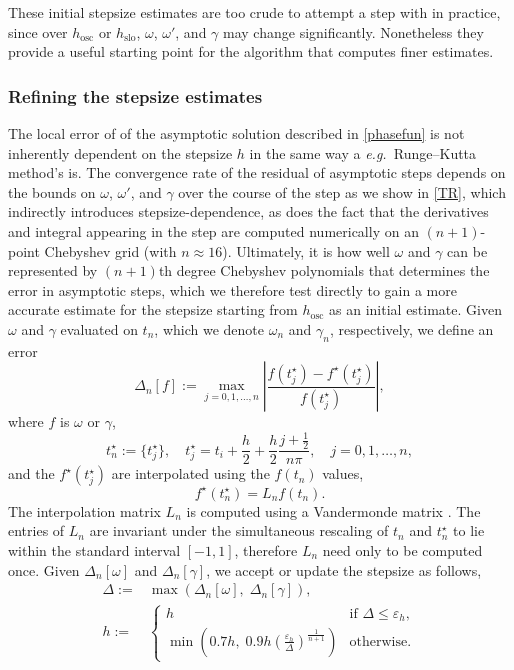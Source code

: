 \documentclass[10pt]{article}
\newcommand{\be}{\begin{equation}}
\newcommand{\ee}{\end{equation}}
\newcommand{\eg}{{\it e.g.\ }}
\newcommand{\om}{\omega}
\newcommand{\g}{\gamma}
\begin{document}
These initial stepsize estimates are too crude to attempt a step with in
practice, since over $h_{\text{osc}}$ or  $h_{\text{slo}}$, $\om$, $\om'$, and $\g$ may change significantly. 
Nonetheless they provide a useful starting point for the algorithm that computes
finer estimates.

\subsubsection{Refining the stepsize estimates}

The local error of of the asymptotic solution described in \cref{phasefun} is not
inherently dependent on the stepsize $h$ in the same way a \eg Runge--Kutta
method's is. The convergence rate of the residual of asymptotic steps depends
on the bounds on $\om$, $\om'$, and $\g$ over the course of the step as we show
in \cref{TR}, which indirectly introduces stepsize-dependence, as does the fact
that the derivatives and integral appearing in the step are computed
numerically on an $(n+1)$-point Chebyshev grid (with $n \approx 16$). Ultimately, it is how well $\om$ and $\g$ can be represented by $(n+1)$th
degree Chebyshev polynomials that determines the error in asymptotic steps, which
we therefore test directly to gain a more accurate estimate for the stepsize
starting from $h_{\text{osc}}$ as an initial estimate. Given $\om$ and $\g$ evaluated on $t_n$, 
which we denote $\om_n$ and $\g_n$, respectively, we define an error
\be
    \Delta_n[f] := \max_{j = 0, 1, \ldots, n} \left| \frac{f(t^{\star}_j) -
    f^{\star}(t^{\star}_j)}{f(t^{\star}_j)} \right|,
\ee
where $f$ is $\om$ or $\g$, 
\be
t^{\star}_n := \{t^{\star}_j\}, \quad t^{\star}_j = t_i + \frac{h}{2} + \frac{h}{2}\frac{j + \frac{1}{2}}{n\pi}, \quad j = 0, 1, \ldots, n,
\ee
and the $f^{\star}(t^{\star}_j)$ are interpolated using the $f(t_n)$ values,
\be
f^{\star}(t^{\star}_n) = L_n f(t_n).
\ee
The interpolation matrix $L_n$ is computed using a Vandermonde matrix \cite{atap}. The entries of $L_n$ are invariant under the simultaneous rescaling of
$t_n$ and $t^{\star}_n$ to lie within the standard interval $[-1, 1]$,
therefore $L_n$ need only to be computed once.
Given $\Delta_n[\om]$ and $\Delta_n[\g]$, we accept or update the stepsize as follows,
\begin{align}
    \Delta :=& \max \left(\Delta_n[\om], \; \Delta_n[\g]\right), \\
    h :=& \begin{cases}
        h &\text{if } \Delta \leq \varepsilon_h, \\
        \min \left( 0.7h,\; 0.9 h \left( \frac{\varepsilon_h}{\Delta} \right)^{\frac{1}{n+1}} \right) &\text{otherwise}.
    \end{cases}
\end{align}
\end{document}
